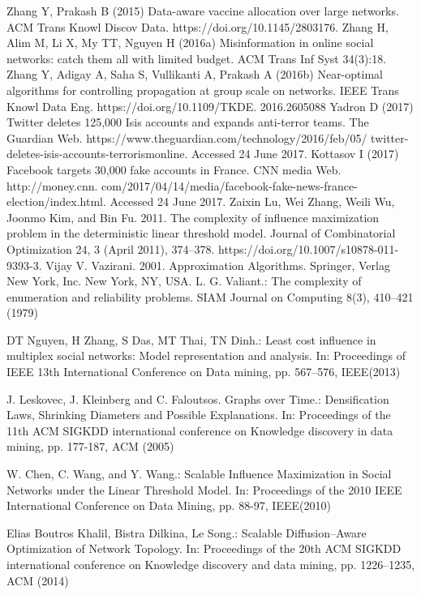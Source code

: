 \begin{thebibliography}{4}
	 Zhang Y, Prakash B (2015) Data-aware vaccine allocation over large networks. ACM Trans Knowl Discov Data. https://doi.org/10.1145/2803176.
	 Zhang H, Alim M, Li X, My TT, Nguyen H (2016a) Misinformation in online social networks: catch them all with limited budget. ACM Trans Inf Syst 34(3):18.
	 Zhang Y, Adigay A, Saha S, Vullikanti A, Prakash A (2016b) Near-optimal algorithms for controlling propagation at group scale on networks. IEEE Trans Knowl Data Eng. https://doi.org/10.1109/TKDE. 2016.2605088
	 Yadron D (2017) Twitter deletes 125,000 Isis accounts and expands anti-terror teams. The Guardian Web. https://www.theguardian.com/technology/2016/feb/05/ twitter-deletes-isis-accounts-terrorismonline. Accessed 24 June 2017.
	  Kottasov I (2017) Facebook targets 30,000 fake accounts in France. CNN media Web. http://money.cnn. com/2017/04/14/media/facebook-fake-news-france-election/index.html. Accessed 24 June 2017.
	 Zaixin Lu, Wei Zhang, Weili Wu, Joonmo Kim, and Bin Fu. 2011. The complexity of influence maximization problem in the deterministic linear threshold model. Journal of Combinatorial Optimization 24, 3 (April 2011), 374–378. https://doi.org/10.1007/s10878-011-9393-3. 
	 Vijay V. Vazirani. 2001. Approximation Algorithms. Springer, Verlag New York, Inc. New York, NY, USA.
	 L. G. Valiant.: The complexity of enumeration and reliability problems. SIAM Journal on Computing 8(3), 410--421 (1979)
	
	 DT Nguyen, H Zhang, S Das, MT Thai, TN Dinh.: Least cost influence in multiplex social networks: Model representation and analysis. In: Proceedings of  IEEE 13th International Conference on Data mining, pp. 567--576, IEEE(2013)
	
	 J. Leskovec, J. Kleinberg and C. Faloutsos. Graphs over Time.: Densification Laws, Shrinking Diameters and Possible Explanations. In: Proceedings of the 11th ACM SIGKDD international conference on Knowledge discovery in data mining, pp. 177-187, ACM (2005) 
	
	 W. Chen, C. Wang, and Y. Wang.: Scalable Influence Maximization in Social Networks under the Linear Threshold Model. In: Proceedings of the 2010 IEEE International Conference on Data Mining, pp. 88-97, IEEE(2010) 
	
	 Elias Boutros Khalil, Bistra Dilkina, Le Song.: Scalable Diffusion--Aware Optimization of Network Topology. In: Proceedings of the 20th ACM SIGKDD international conference on Knowledge discovery and data mining, pp. 1226--1235, ACM (2014)
	

\end{thebibliography}
